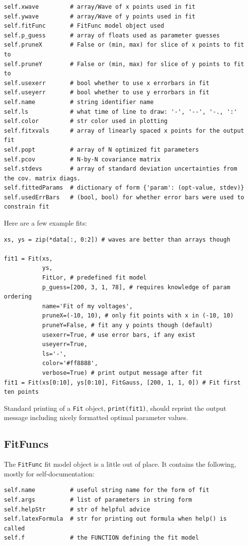 \documentclass[10pt]{report}
\begin{document}
\begin{lstlisting}[caption={Fit() properties}, style=properties]
self.xwave         # array/Wave of x points used in fit
self.ywave         # array/Wave of y points used in fit
self.fitFunc       # FitFunc model object used
self.p_guess       # array of floats used as parameter guesses
self.pruneX        # False or (min, max) for slice of x points to fit to
self.pruneY        # False or (min, max) for slice of y points to fit to
self.usexerr       # bool whether to use x errorbars in fit
self.useyerr       # bool whether to use y errorbars in fit
self.name          # string identifier name
self.ls            # what time of line to draw: '-', '--', '-., ':'
self.color         # str color used in plotting
self.fitxvals      # array of linearly spaced x points for the output fit
self.popt          # array of N optimized fit parameters
self.pcov          # N-by-N covariance matrix
self.stdevs        # array of standard deviation uncertainties from the cov. matrix diags.
self.fittedParams  # dictionary of form {'param': (opt-value, stdev)}
self.usedErrBars   # (bool, bool) for whether error bars were used to constrain fit
\end{lstlisting}

Here are a few example fits:
\begin{lstlisting}[caption=Fit() creation]
xs, ys = zip(*data[:, 0:2]) # waves are better than arrays though

fit1 = Fit(xs,
           ys,
           FitLor, # predefined fit model
           p_guess=[200, 3, 1, 78], # requires knowledge of param ordering
           name='Fit of my voltages',
           pruneX=(-10, 10), # only fit points with x in (-10, 10)
           pruneY=False, # fit any y points though (default)
           usexerr=True, # use error bars, if any exist
           useyerr=True,
           ls='-',
           color='#ff8888',
           verbose=True) # print output message after fit
fit1 = Fit(xs[0:10], ys[0:10], FitGauss, [200, 1, 1, 0]) # Fit first ten points
\end{lstlisting}

Standard printing of a \texttt{Fit} object, \texttt{print(fit1)}, should reprint the output message including nicely formatted optimal parameter values.


\clearpage
\subsection{FitFuncs}\label{sec:fitfuncs}
The \texttt{FitFunc} fit model object is a little out of place. It contains the following, mostly for self-documentation:
\begin{lstlisting}[caption={FitFunc properties}, style=properties]
self.name          # useful string name for the form of fit
self.args          # list of parameters in string form
self.helpStr       # str of helpful advice
self.latexFormula  # str for printing out formula when help() is called
self.f             # the FUNCTION defining the fit model
\end{lstlisting}
\end{document}
